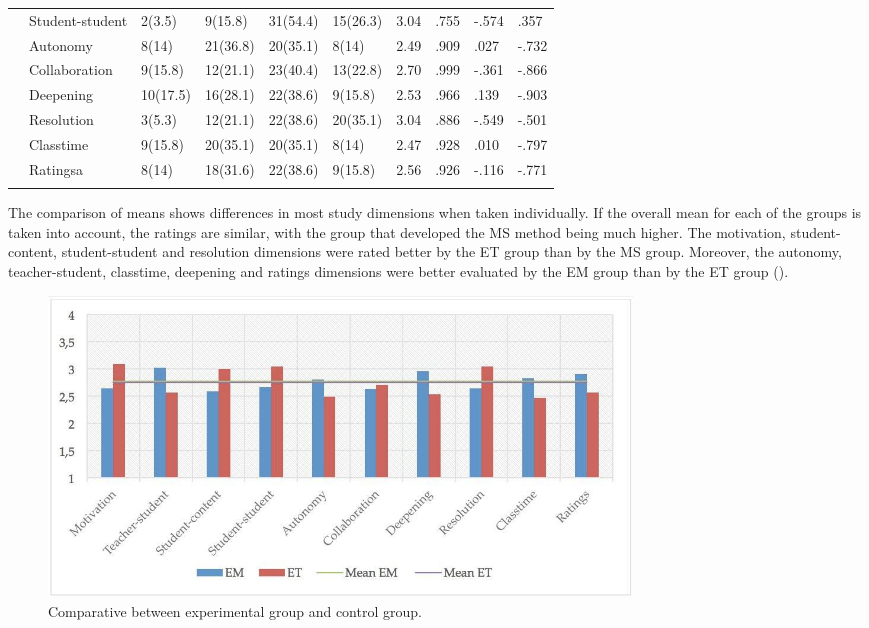 \documentclass[english]{textolivre}
\begin{document}
\begin{table}[htpb]
\begin{tabular}{p{}p{}p{}p{}p{}p{}p{}p{}p{}p{}}
\\
& Student-student & 2(3.5) & 9(15.8) & 31(54.4) & 15(26.3) & 3.04 & .755 & -.574 & .357
\\
& Autonomy	& 8(14) & 21(36.8) & 20(35.1) & 8(14) & 2.49 & .909 & .027 & -.732
\\
& Collaboration	& 9(15.8) & 12(21.1) & 23(40.4) & 13(22.8) & 2.70 & .999 & -.361 & -.866
\\
& Deepening	& 10(17.5) & 16(28.1) & 22(38.6) & 9(15.8) & 2.53 & .966 & .139 & -.903
\\
& Resolution & 3(5.3) & 12(21.1) & 22(38.6) & 20(35.1) & 3.04 & .886 & -.549 & -.501
\\
& Classtime	& 9(15.8) & 20(35.1) & 20(35.1) & 8(14) & 2.47 & .928 & .010 & -.797
\\
& Ratingsa & 8(14) & 18(31.6) & 22(38.6) & 9(15.8) & 2.56 & .926 & -.116 & -.771
\\
\arrayrulecolor{black}
\bottomrule
\end{tabular}
\centering
{}
\end{table}

The comparison of means shows differences in most study dimensions when taken individually. If the overall mean for each of the groups is taken into account, the ratings are similar, with the group that developed the MS method being much higher. The motivation, student-content, student-student and resolution dimensions were rated better by the ET group than by the MS group. Moreover, the autonomy, teacher-student, classtime, deepening and ratings dimensions were better evaluated by the EM group than by the ET group ().

\begin{figure}[htbp]
 \centering
 \includegraphics[width=0.75\textwidth]{fig-004.jpg}
 \caption{Comparative between experimental group and control group.}
 \label{fig4}
\end{figure}
\end{document}
